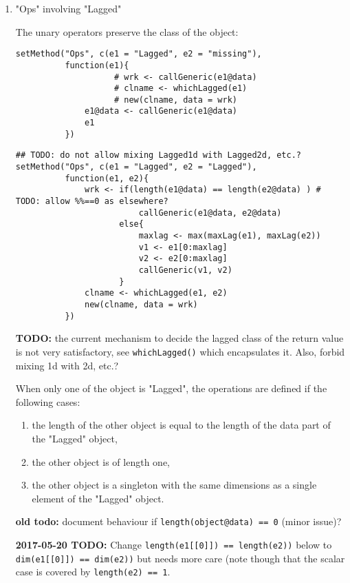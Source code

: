 \documentclass[11pt,a4paper]{article}
\begin{document}
\begin{enumerate}
\item "Ops" involving "Lagged"
\label{sec:org900e3cd}

The unary operators preserve the class of the object:
\begin{verbatim}
setMethod("Ops", c(e1 = "Lagged", e2 = "missing"),
          function(e1){
                    # wrk <- callGeneric(e1@data)
                    # clname <- whichLagged(e1)
                    # new(clname, data = wrk)
              e1@data <- callGeneric(e1@data)
              e1
          })
\end{verbatim}

\begin{verbatim}
## TODO: do not allow mixing Lagged1d with Lagged2d, etc.?
setMethod("Ops", c(e1 = "Lagged", e2 = "Lagged"),
          function(e1, e2){
              wrk <- if(length(e1@data) == length(e2@data) ) # TODO: allow %%==0 as elsewhere?
                         callGeneric(e1@data, e2@data)
                     else{
                         maxlag <- max(maxLag(e1), maxLag(e2))
                         v1 <- e1[0:maxlag]
                         v2 <- e2[0:maxlag]
                         callGeneric(v1, v2)
                     }
              clname <- whichLagged(e1, e2)
              new(clname, data = wrk)
          })
\end{verbatim}
\textbf{TODO:} the current mechanism to decide the lagged class of the return value is not very
satisfactory, see \texttt{whichLagged()} which encapsulates it. Also, forbid mixing 1d with 2d,
etc.?

When only one of the object is "Lagged", the operations are defined if the following cases:

\begin{enumerate}
\item the length of the other object is equal to the length of the data part of the "Lagged"
object,
\item the other object is of length one,
\item the other object is a singleton with the same dimensions as a single element of the
"Lagged" object.
\end{enumerate}

\textbf{old todo:} document behaviour if \texttt{length(object@data) == 0} (minor issue)?

\textbf{2017-05-20 TODO:} Change \texttt{length(e1[[0]]) == length(e2))} below to
                   \texttt{dim(e1[[0]]) == dim(e2))} but needs more care (note though that the
                   scalar case is covered by \texttt{length(e2) == 1}.


\end{enumerate}
\end{document}
